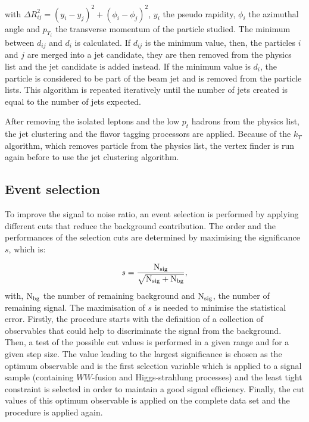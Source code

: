     with $\Delta R^2_{ij} = \left( y_{i} - y_{j}\right)^2 + \left( \phi_{i} - \phi_{j}\right)^2$, $y_{i}$ the pseudo rapidity, $\phi_{i}$ the azimuthal angle and $p_{T_i}$ the transverse momentum of the particle studied.
    The minimum between $d_{ij}$ and $d_{i}$ is calculated.
    If $d_{ij}$ is the minimum value, then, the particles $i$ and $j$ are merged into a jet candidate, they are then removed from the physics list and the jet candidate is added instead.
    If the minimum value is $d_{i}$, the particle is considered to be part of the beam jet and is removed from the particle lists.
    This algorithm is repeated iteratively until the number of jets created is equal to the number of jets expected.
   
    After removing the isolated leptons and the low $p_{t}$ hadrons from the physics list, the jet clustering and the flavor tagging processors are applied. 
    Because of the $k_{T}$ algorithm, which removes particle from the physics list, the vertex finder is run again before to use the jet clustering algorithm.

  \subsection{Event selection}

  To improve the signal to noise ratio, an event selection is performed by applying different cuts that reduce the background contribution.
  The order and the performances of the selection cuts are determined by maximising the significance $s$, which is:

  \begin{equation}
    s = \frac{\rm{N_{sig}}}{\sqrt{\rm{N_{sig}}+ \rm{N_{bg}}}},
  \end{equation}
  with, $\rm{N_{bg}}$ the number of remaining background and $\rm{N_{sig}}$, the number of remaining signal.
  The maximisation of $s$ is needed to minimise the statistical error.
  Firstly, the procedure starts with the definition of a collection of observables that could help to discriminate the signal from the background.
  Then, a test of the possible cut values is performed in a given range and for a given step size.
  The value leading to the largest significance is chosen as the optimum observable and is the first selection variable which is applied to a signal sample (containing $WW$-fusion and Higgs-strahlung processes) and the least tight constraint is selected in order to maintain a good signal efficiency.
  Finally, the cut values of this optimum observable is applied on the complete data set and the procedure is applied again.


